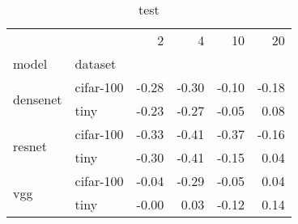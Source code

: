 \begin{table}
\caption{test}
\begin{tabular}{llrrrr}
\toprule
 &  & 2 & 4 & 10 & 20 \\
model & dataset &  &  &  &  \\
\midrule
\multirow[c]{2}{*}{densenet} & cifar-100 & -0.28 & -0.30 & -0.10 & -0.18 \\
 & tiny & -0.23 & -0.27 & -0.05 & 0.08 \\
\multirow[c]{2}{*}{resnet} & cifar-100 & -0.33 & -0.41 & -0.37 & -0.16 \\
 & tiny & -0.30 & -0.41 & -0.15 & 0.04 \\
\multirow[c]{2}{*}{vgg} & cifar-100 & -0.04 & -0.29 & -0.05 & 0.04 \\
 & tiny & -0.00 & 0.03 & -0.12 & 0.14 \\
\bottomrule
\end{tabular}
\end{table}
